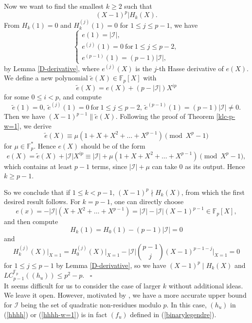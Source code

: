 \documentclass [11pt,a4paper]{article}
\def\F{\mathbb{F}}
\begin{document}
Now we want to find the smallest $k\ge 2$ such that
$$
(X-1)^{p}| H_k(X).
$$
From $H_k(1)=0$ and $H^{(j)}_k(1)=0$  for $1\le j\le p-1$, we have
$$
\left\{
\begin{array}{l}
e(1)=|\mathcal{I}|,\\
e^{(j)}(1)=0 ~\mathrm{for}~1\le j\le p-2,\\
e^{(p-1)}(1)=(p-1)|\mathcal{I}|,
\end{array}
\right.
$$
by Lemma \ref{D-derivative}, where  $e^{(j)}(X)$ is the $j$-th Hasse derivative of $e(X)$. We define a new polynomial $\widetilde{e}(X)\in\F_p[X]$ with
$$
\widetilde{e}(X)=e(X)+(p-|\mathcal{I}|)X^{ip}
$$
for some $0\le i<p$, and compute
$$
\widetilde{e}(1)=0, ~ \widetilde{e}^{(j)}(1)=0 ~\mathrm{for}~1\le j\le p-2, ~
\widetilde{e}^{(p-1)}(1)=(p-1)|\mathcal{I}|\neq 0.
$$
Then we have $(X-1)^{p-1}\| \widetilde{e}(X)$. Following the proof of Theorem \ref{klc-p-w=1}, we derive
$$
\widetilde{e}(X)\equiv \mu (1+X+X^{2}+\ldots+X^{p-1})\pmod {X^p-1}
$$
for $\mu\in\F_p^*$. Hence $e(X)$ should be of the form
$$
e(X)=\widetilde{e}(X)+|\mathcal{I}|X^{ip}\equiv |\mathcal{I}|+\mu (1+X+X^{2}+\ldots+X^{p-1}) \pmod {X^p-1},
$$
which contains at least $p-1$ terms, since $|\mathcal{I}|+\mu$ can take $0$ as its output. Hence $k\ge p-1$.

So we conclude that if $1\le k<p-1$, $(X-1)^{p}\nmid  H_k(X)$, from which the first desired result follows.
For $k=p-1$, one can directly choose
$$
e(x)=-|\mathcal{I}|(X+X^{2}+\ldots+X^{p-1})=|\mathcal{I}|-|\mathcal{I}|(X-1)^{p-1}\in\F_p[X],
$$
and then compute
$$
H_k(1)=H_0(1)-(p-1)|\mathcal{I}|=0
$$
and
$$
H^{(j)}_k(X)\bigg|_{X=1}= H^{(j)}_0(X)\bigg|_{X=1}- |\mathcal{I}|\binom{p-1}{j}(X-1)^{p-1-j}\bigg|_{X=1}=0
$$
for $1\le j\le p-1$ by Lemma \ref{D-derivative}, so we have $(X-1)^{p}\mid H_k(X)$ and  $LC^{\F_p}_{p-1}((h_u))\le p^2-p$.
 ~\hfill $\square$\\


It seems difficult for us to consider the case of larger $k$ without additional ideas. We leave it open. However, motivated by \cite{AMW,AW06}, we have a more accurate upper bound for $\mathcal{I}$ being the set of quadratic non-residues modulo $p$.
In this case, $(h_u)$  in (\ref{hhhh}) or (\ref{hhhh-w=1}) is in fact $(f_u)$ defined in (\ref{binarylegendre}).
\end{document}
